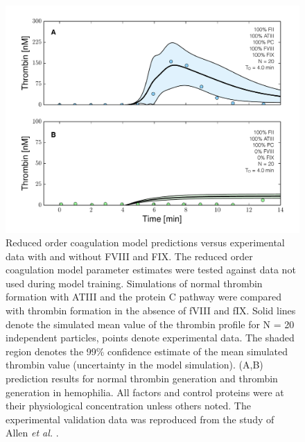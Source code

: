 \documentclass[processes,article,received,moreauthors,pdftex,12pt,a4paper]{mdpi}
\begin{document}
\begin{figure}[H]
\centering
\includegraphics[width=1.0\textwidth]{./figs/Figure-6-Hemophilia.pdf}
\caption{Reduced order coagulation model predictions versus experimental data with and without FVIII and FIX.
The reduced order coagulation model parameter estimates were tested against data not used during model training. 
Simulations of normal thrombin formation with ATIII and the protein C pathway were compared with thrombin formation in the absence of fVIII and fIX.
Solid lines denote the simulated mean value of the thrombin profile for N = 20 independent particles, points denote experimental data.
The shaded region denotes the 99\% confidence estimate of the mean simulated thrombin value (uncertainty in the model simulation). 
(A,B) prediction results for normal thrombin generation and thrombin generation in hemophilia. 
All factors and control proteins were at their physiological concentration unless others noted.
The experimental validation data was reproduced from the study of Allen \textit{et al.} \citep{ALLEN2006}.}\label{fig-hemophilia}
\end{figure}
\end{document}
